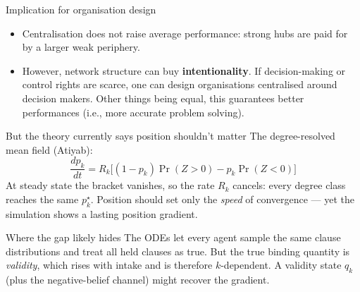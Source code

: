 \documentclass[aspectratio=169,11pt]{beamer}
\begin{document}

\begin{frame}{Implication for organisation design}
  \begin{itemize}
    \item Centralisation does not raise average performance: strong hubs are
          paid for by a larger weak periphery.
    \item However, network structure can buy \textbf{intentionality}. If decision-making or control rights are scarce, one can design organisations centralised around decision makers. Other things being equal, this guarantees better performances (i.e., more accurate problem solving).
  \end{itemize}
  \vspace{10pt}
\end{frame}

\begin{frame}{But the theory currently says position shouldn't matter}
  {\small The degree-resolved mean field (Atiyab):}
  \[ \frac{dp_k}{dt} = R_k\bigl[(1-p_k)\Pr(Z>0) - p_k\Pr(Z<0)\bigr] \]
  {\small At steady state the bracket vanishes, so the rate $R_k$ cancels: every degree
  class reaches the same $p_k^{\star}$. Position should set only the \emph{speed} of
  convergence --- yet the simulation shows a lasting position gradient.}
  \vspace{8pt}
  \begin{block}{Where the gap likely hides}
    The ODEs let every agent sample the same clause distributions and treat all held
    clauses as true. But the true binding quantity is \emph{validity}, which rises
    with intake and is therefore $k$-dependent. A validity state $q_k$ (plus the
    negative-belief channel) might recover the gradient.
  \end{block}
\end{frame}
\end{document}
